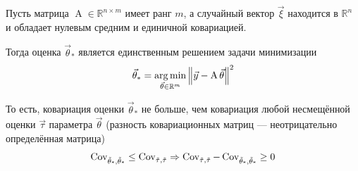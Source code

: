 \begin{theorem}
  \label{theorem:gaussMarkov}
  Пусть матрица $\operatorname{A} \in \mathbb{R}^{n \times m}$ имеет ранг $m$,
  а случайный вектор $\vec{\xi}$ находится в $\mathbb{R}^n$ и обладает нулевым
  средним и единичной ковариацией.

  Тогда оценка $\vec{\theta}_*$ является единственным решением задачи
  минимизации
  \begin{align*}
      \vec{\theta}_*
      = \argminof{\left\| \vec{y} - \operatorname{A} \vec{\theta} \right\|^2}{
      \vec{\theta} \in \mathbb{R}^m}
  \end{align*}

  То есть, ковариация оценки $\vec{\theta}_*$ не больше, чем ковариация любой
  несмещённой оценки $\vec{\tau}$ параметра $\vec{\theta}$ (разность
  ковариационных матриц --- неотрицательно определённая матрица)
  \begin{align*}
      \dCov{\vec{\theta}_*} \le \dCov{\vec{\tau}}
      \Rightarrow \dCov{\vec{\tau}} - \dCov{\vec{\theta}_*} \ge 0
  \end{align*}
\end{theorem}
